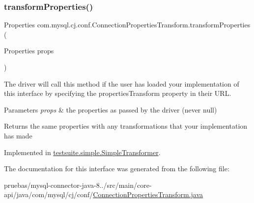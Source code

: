 \subsubsection{\texorpdfstring{transform\+Properties()}{transformProperties()}}
{\footnotesize\ttfamily Properties com.\+mysql.\+cj.\+conf.\+Connection\+Properties\+Transform.\+transform\+Properties (\begin{DoxyParamCaption}\item[{Properties}]{props }\end{DoxyParamCaption})}

The driver will call this method if the user has loaded your implementation of this interface by specifying the \textquotesingle{}properties\+Transform\textquotesingle{} property in their U\+RL.


\begin{DoxyParams}{Parameters}
{\em props} & the properties as passed by the driver (never null)\\
\hline
\end{DoxyParams}
\begin{DoxyReturn}{Returns}
the same properties with any transformations that your implementation has made 
\end{DoxyReturn}


Implemented in \mbox{\hyperlink{classtestsuite_1_1simple_1_1_simple_transformer_aadfc91d352f3a7b94257f30b319cb258}{testsuite.\+simple.\+Simple\+Transformer}}.



The documentation for this interface was generated from the following file\+:\begin{DoxyCompactItemize}
\item 
pruebas/mysql-\/connector-\/java-\/8../src/main/core-\/api/java/com/mysql/cj/conf/\mbox{\hyperlink{_connection_properties_transform_8java}{Connection\+Properties\+Transform.\+java}}\end{DoxyCompactItemize}
